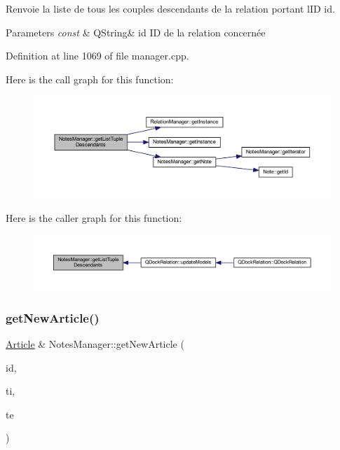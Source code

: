 Renvoie la liste de tous les couples descendants de la relation portant l\textquotesingle{}ID id. 


\begin{DoxyParams}{Parameters}
{\em const} & Q\+String\& id ID de la relation concernée \\
\hline
\end{DoxyParams}


Definition at line 1069 of file manager.\+cpp.

Here is the call graph for this function\+:\nopagebreak
\begin{figure}[H]
\begin{center}
\leavevmode
\includegraphics[width=350pt]{class_notes_manager_a4b8636fd8bc9d750d778585d3e4372cf_cgraph}
\end{center}
\end{figure}
Here is the caller graph for this function\+:\nopagebreak
\begin{figure}[H]
\begin{center}
\leavevmode
\includegraphics[width=350pt]{class_notes_manager_a4b8636fd8bc9d750d778585d3e4372cf_icgraph}
\end{center}
\end{figure}
\mbox{\label{class_notes_manager_a44bfd4e7fe88b7f300a4be5589f92923}} 
\subsubsection{\texorpdfstring{get\+New\+Article()}{getNewArticle()}}
{\footnotesize\ttfamily \hyperlink{class_article}{Article} \& Notes\+Manager\+::get\+New\+Article (\begin{DoxyParamCaption}\item[{const Q\+String \&}]{id,  }\item[{const Q\+String \&}]{ti,  }\item[{const Q\+String \&}]{te }\end{DoxyParamCaption})}



